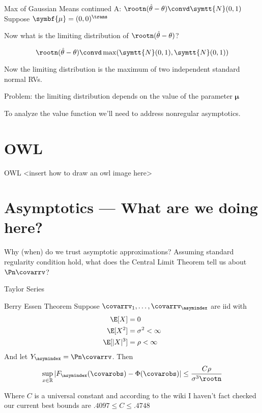 \documentclass[aspectratio=169, professionalfonts]{beamer}
\begin{document}
\begin{frame}{Max of Gaussian Means continued}
	A: $\rootn (\hat{\theta} - \theta) \convd \symtt{N}(0, 1)$
	\pause
	\vfill
	Suppose $\symbf{\mu} = (0 , 0)^{\trans}$

	Now what is the limiting distribution of $ \rootn (\hat{\theta} - \theta)$?

	\vfill \pause

	$$\rootn (\hat{\theta} - \theta) \convd \max(\symtt{N}(0, 1), \symtt{N}(0, 1))$$

	Now the limiting distribution is the maximum of two independent standard
	normal RVs.

	\vfill \pause

	Problem: the limiting distribution depends on the value of the parameter
	$\symbf{\mu}$

	\vfill

	To analyze the value function we'll need to address nonregular asymptotics.
\end{frame}


\section{OWL}
\begin{frame}{OWL}
	<insert how to draw an owl image here>
\end{frame}



\section{Asymptotics --- What are we doing here?}
\begin{frame}{Why (when) do we trust asymptotic approximations?}
	Assuming standard regularity condition hold, what does the Central Limit
	Theorem tell us about $\Pn \covarrv$?

	Taylor Series
\end{frame}

\begin{frame}{Berry Essen Theorem}
	Suppose $\covarrv_1, \ldots, \covarrv_{\asymindex}$ are iid with
	\begin{align*}
		\E[X]     & = 0                 \\
		\E[X^2]   & = \sigma^2 < \infty \\
		\E[|X|^3] & = \rho < \infty
	\end{align*}
	And let $Y_{\asymindex} = \Pn \covarrv$. Then
	\vfill
	\begin{equation}
		\sup_{x \in \mathbb{R}}|F_{\asymindex}(\covarobs) - \Phi(\covarobs)| \leq \frac{C
			\rho}{\sigma^{3} \rootn }
	\end{equation}

	Where $C$ is a universal constant and according to the wiki I haven't fact
	checked our current best bounds are $.4097 \leq C \leq .4748$
	\vfill
\end{frame}
\end{document}
